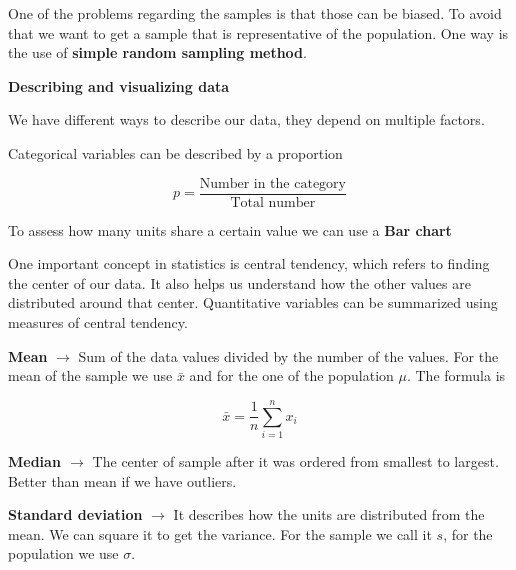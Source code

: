 One of the problems regarding the samples is that those can be biased. To avoid that we want to get a sample that is representative of the population. One way is the use of \textbf{simple random sampling method}.

\textbf{Describing and visualizing data}

We have different ways to describe our data, they depend on multiple factors.

Categorical variables can be described by a proportion



\[
p = \frac{\text{Number in the category}}{\text{Total number}}
\]

To assess how many units share a certain value we can use a \textbf{Bar chart}


\vspace{10pt}

One important concept in statistics is central tendency, which refers to finding the center of our data. It also helps us understand how the other values are distributed around that center. Quantitative variables can be summarized using measures of central tendency.

\vspace{10pt}

\textbf{Mean} $\xrightarrow{}$ Sum of the data values divided by the number of the values. For the mean of the sample we use $\bar{x}$ and for the one of the population $\mu$. The formula is

\[
\bar{x} = \frac{1}{n} \sum_{i=1}^n x_i
\]

\vspace{10pt}

\textbf{Median $\xrightarrow{}$} The center of sample after it was ordered from smallest to largest. Better than mean if we have outliers.

\vspace{10pt}

\textbf{Standard deviation} $\xrightarrow{}$ It describes how the units are distributed from the mean. We can square it to get the variance. For the sample we call it $s$, for the population we use $\sigma$. 

